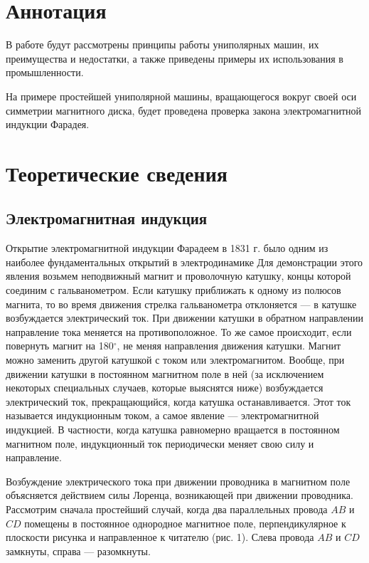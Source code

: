  
\usepackage{mathrsfs}
\usepackage[e]{esvect}
\newcommand{\dive}{\mathrm{div}}
\newcommand{\rot}{\mathrm{rot}}

\renewcommand{\vv}{\vec}

\section{Аннотация}
В работе будут рассмотрены принципы работы
униполярных машин, их преимущества и
недостатки, а также приведены примеры их
использования в промышленности.

На примере простейшей униполярной
машины, вращающегося вокруг своей оси
симметрии магнитного диска, будет
проведена проверка закона
электромагнитной индукции Фарадея.

\section {Теоретические сведения}
\subsection{Электромагнитная индукция}

Открытие электромагнитной индукции
Фарадеем в 1831 г. было одним из
наиболее фундаментальных открытий в
электродинамике Для демонстрации этого
явления возьмем неподвижный магнит и
проволочную катушку, концы которой
соединим с гальванометром. Если катушку
приближать к одному из полюсов магнита,
то во время движения стрелка
гальванометра отклоняется — в катушке
возбуждается электрический ток. При
движении катушки в обратном направлении
направление тока меняется на
противоположное. То же самое происходит,
если повернуть магнит на 180$^\circ$, не меняя
направления движения катушки. Магнит
можно заменить другой катушкой с током
или электромагнитом. Вообще, при
движении катушки в постоянном магнитном
поле в ней (за исключением некоторых
специальных случаев, которые выяснятся
ниже) возбуждается электрический ток,
прекращающийся, когда катушка
останавливается. Этот ток называется
индукционным током, а самое явление —
электромагнитной индукцией. В
частности, когда катушка равномерно
вращается в постоянном магнитном поле,
индукционный ток периодически меняет
свою силу и направление.

Возбуждение электрического тока при
движении проводника в магнитном поле
объясняется действием силы Лоренца,
возникающей при движении проводника.
Рассмотрим сначала простейший случай,
когда два параллельных провода $AB$ и
$CD$  
помещены в постоянное однородное
магнитное поле, перпендикулярное к
плоскости рисунка и направленное к
читателю (рис. 1). Слева провода $AB$ и
$CD$ замкнуты, справа — разомкнуты. 

